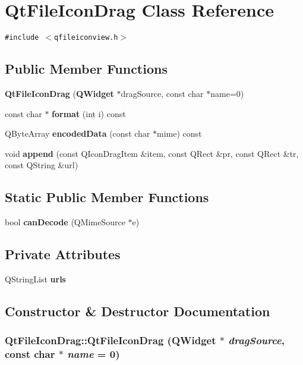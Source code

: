 \section{Qt\-File\-Icon\-Drag Class Reference}
\label{classQtFileIconDrag}
{\tt \#include $<$qfileiconview.h$>$}

\subsection*{Public Member Functions}
\begin{CompactItemize}
\item 
{\bf Qt\-File\-Icon\-Drag} ({\bf QWidget} $\ast$drag\-Source, const char $\ast$name=0)
\item 
const char $\ast$ {\bf format} (int i) const 
\item 
QByte\-Array {\bf encoded\-Data} (const char $\ast$mime) const 
\item 
void {\bf append} (const QIcon\-Drag\-Item \&item, const QRect \&pr, const QRect \&tr, const QString \&url)
\end{CompactItemize}
\subsection*{Static Public Member Functions}
\begin{CompactItemize}
\item 
bool {\bf can\-Decode} (QMime\-Source $\ast$e)
\end{CompactItemize}
\subsection*{Private Attributes}
\begin{CompactItemize}
\item 
QString\-List {\bf urls}
\end{CompactItemize}


\subsection{Constructor \& Destructor Documentation}
\subsubsection{\setlength{\rightskip}{0pt plus 5cm}Qt\-File\-Icon\-Drag::Qt\-File\-Icon\-Drag ({\bf QWidget} $\ast$ {\em drag\-Source}, const char $\ast$ {\em name} = 0)}\label{classQtFileIconDrag_QtFileIconDraga0}




